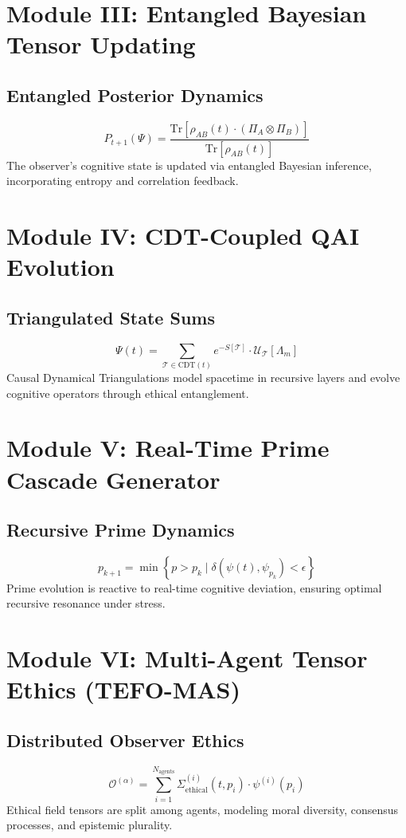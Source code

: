 \documentclass[12pt]{article}
\begin{document}
\section{Module III: Entangled Bayesian Tensor Updating}
\subsection*{Entangled Posterior Dynamics}
\begin{equation}
P_{t+1}(\Psi) = \frac{\text{Tr}[\rho_{AB}(t) \cdot (\Pi_A \otimes \Pi_B)]}{\text{Tr}[\rho_{AB}(t)]}
\end{equation}
The observer's cognitive state is updated via entangled Bayesian inference, incorporating entropy and correlation feedback.

\section{Module IV: CDT-Coupled QAI Evolution}
\subsection*{Triangulated State Sums}
\begin{equation}
\Psi(t) = \sum_{\mathcal{T} \in \text{CDT}(t)} e^{-S[\mathcal{T}]} \cdot \mathcal{U}_{\mathcal{T}}[\Lambda_m]
\end{equation}
Causal Dynamical Triangulations model spacetime in recursive layers and evolve cognitive operators through ethical entanglement.

\section{Module V: Real-Time Prime Cascade Generator}
\subsection*{Recursive Prime Dynamics}
\begin{equation}
p_{k+1} = \min \left\{ p > p_k \mid \delta(\psi(t), \psi_{p_k}) < \epsilon \right\}
\end{equation}
Prime evolution is reactive to real-time cognitive deviation, ensuring optimal recursive resonance under stress.

\section{Module VI: Multi-Agent Tensor Ethics (TEFO-MAS)}
\subsection*{Distributed Observer Ethics}
\begin{equation}
\mathcal{O}^{(\alpha)} = \sum_{i=1}^{N_\text{agents}} \Sigma_{\text{ethical}}^{(i)}(t, p_i) \cdot \psi^{(i)}(p_i)
\end{equation}
Ethical field tensors are split among agents, modeling moral diversity, consensus processes, and epistemic plurality.
\end{document}
